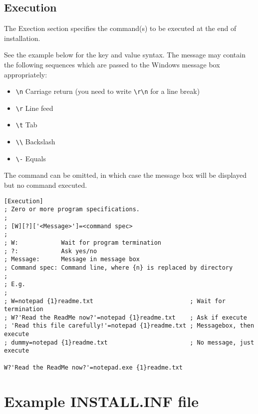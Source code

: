 \subsection{Execution}

The Exection section specifies the command(s) to be
executed at the end of installation.

See the example below for the key and value syntax.
The message may contain the following sequences which
are passed to the Windows message box appropriately:

\begin{itemize}\itemsep=0pt
\item \verb$\n$ Carriage return (you need to write \verb$\r\n$ for a line break)
\item \verb$\r$ Line feed
\item \verb$\t$ Tab
\item \verb$\\$ Backslash
\item \verb$\-$ Equals
\end{itemize}

The command can be omitted, in which case the message box
will be displayed but no command executed.

\begin{verbatim}
[Execution]
; Zero or more program specifications.
;
; [W][?]['<Message>']=<command spec>
;
; W:            Wait for program termination
; ?:            Ask yes/no
; Message:      Message in message box
; Command spec: Command line, where {n} is replaced by directory
;
; E.g.
;
; W=notepad {1}readme.txt                           ; Wait for termination
; W?'Read the ReadMe now?'=notepad {1}readme.txt    ; Ask if execute
; 'Read this file carefully!'=notepad {1}readme.txt ; Messagebox, then execute
; dummy=notepad {1}readme.txt                       ; No message, just execute

W?'Read the ReadMe now?'=notepad.exe {1}readme.txt
\end{verbatim}

\section{Example INSTALL.INF file}

